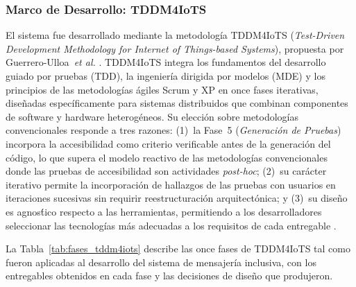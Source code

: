 \documentclass[journal]{IEEEtran}
\begin{document}
			\subsubsection{Marco de Desarrollo: TDDM4IoTS}
				El sistema fue desarrollado mediante la metodolog\'ia TDDM4IoTS (\textit{Test-Driven Development Methodology for Internet of Things-based Systems}), propuesta por Guerrero-Ulloa~\textit{et al.} \cite{guerrero2020}. TDDM4IoTS integra los fundamentos del desarrollo guiado por pruebas (TDD), la ingenier\'ia dirigida por modelos (MDE) y los principios de las metodolog\'ias \'agiles Scrum y XP en once fases iterativas, dise\~nadas espec\'ificamente para sistemas distribuidos que combinan componentes de software y hardware heterog\'eneos. Su elecci\'on sobre metodolog\'ias convencionales responde a tres razones: (1)~la Fase~5 (\textit{Generaci\'on de Pruebas}) incorpora la accesibilidad como criterio verificable antes de la generaci\'on del c\'odigo, lo que supera el modelo reactivo de las metodolog\'ias convencionales donde las pruebas de accesibilidad son actividades \textit{post-hoc}; (2)~su car\'acter iterativo permite la incorporaci\'on de hallazgos de las pruebas con usuarios en iteraciones sucesivas sin requirir reestructuraci\'on arquitect\'onica; y (3)~su dise\~no es agnos\'tico respecto a las herramientas, permitiendo a los desarrolladores seleccionar las tecnolog\'ias m\'as adecuadas a los requisitos de cada entregable \cite{guerrero2020}.
				
				La Tabla~\ref{tab:fases_tddm4iots} describe las once fases de TDDM4IoTS tal como fueron aplicadas al desarrollo del sistema de mensajer\'ia inclusiva, con los entregables obtenidos en cada fase y las decisiones de dise\~no que produjeron.
				
\end{document}
